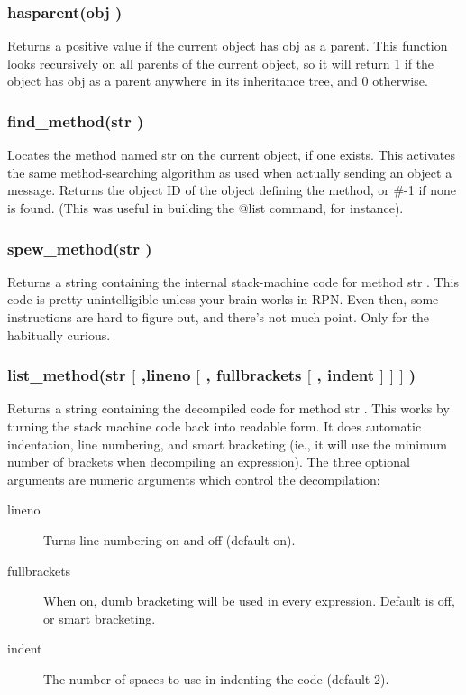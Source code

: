 \subsubsection{\func hasparent({\funcarg obj })}

Returns a positive value if the current object has {\funcarg obj } as a
parent.  This function looks recursively on all parents of the current
object, so it will return 1 if the object has {\funcarg obj } as a
parent anywhere in its inheritance tree, and 0 otherwise.

\subsubsection{\func find\_method({\funcarg str })}

Locates the method named {\funcarg str} on the current object, if one
exists.  This activates the same method-searching algorithm as used
when actually sending an object a message.  Returns the object ID of
the object defining the method, or \#-1 if none is found.  (This was
useful in building the {\keyword @list} command, for instance).

\subsubsection{\func spew\_method({\funcarg str })}

Returns a string containing the internal stack-machine code for method
{\funcarg str }.  This code is pretty unintelligible unless your brain
works in RPN.  Even then, some instructions are hard to figure out,
and there's not much point.  Only for the habitually curious.

\subsubsection{\func list\_method({\funcarg str $[$ },{\funcarg lineno $[$ }, {\funcarg fullbrackets $[$ }, {\funcarg indent $]$ $]$ $]$ })}

Returns a string containing the decompiled code for method {\funcarg str }.
This works by turning the stack machine code back into readable form.
It does automatic indentation, line numbering, and smart bracketing (ie.,
it will use the minimum number of brackets when decompiling an expression).
The three optional arguments are numeric arguments which control the
decompilation:

\begin{description}
\item [lineno] Turns line numbering on and off (default on).
\item [fullbrackets] When on, dumb bracketing will be used in every
		  expression.  Default is off, or smart bracketing.
\item [indent] The number of spaces to use in indenting the code (default 2).
\end{description}

